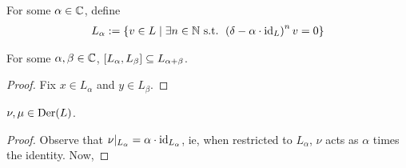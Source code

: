 \begin{boxdefinition}
    For some $\alpha \in \mathbb{C}$, define 
    \begin{align*}
        L_{\alpha} := \left\{ v \in L \; \middle\vert \; \exists n \in \mathbb{N} \text{ s.t. } \left( \delta - \alpha \cdot \operatorname{id}_L \right)^n v = 0 \right\}
    \end{align*}
\end{boxdefinition}

\begin{boxlemma}\label{Ch2:Lemma:BracGenEigenspJordan}
    For some $\alpha, \beta \in \mathbb{C}$, $\left[ L_{\alpha}, L_{\beta} \right] \subseteq L_{\alpha + \beta}$.
\end{boxlemma}
\begin{proof}
    Fix $x \in L_{\alpha}$ and $y \in L_{\beta}$. 
    \sorry
\end{proof}

\begin{boxlemma}
    $\nu, \mu \in \operatorname{Der}\!\left( L \right)$.
\end{boxlemma}
\begin{proof}
    Observe that $\nu\vert_{L_{\alpha}} = \alpha \cdot {\operatorname{id}}_{L_{\alpha}}$, ie, when restricted to $L_{\alpha}$, $\nu$ acts as $\alpha$ times the identity. Now, \sorry
\end{proof}


